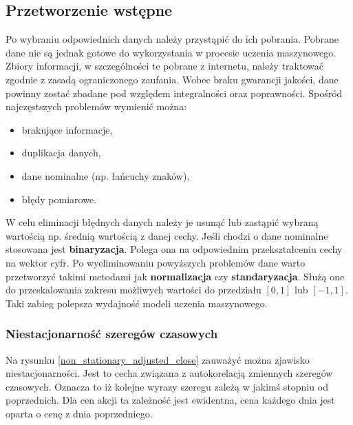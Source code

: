 \documentclass[a4paper, twoside, 11pt, openright]{article}
\begin{document}
\subsection{Przetworzenie wstępne}

Po wybraniu odpowiednich danych należy przystąpić do ich pobrania. Pobrane dane nie są jednak gotowe do wykorzystania w procesie uczenia maszynowego. Zbiory informacji, w szczególności te pobrane z internetu, należy traktować zgodnie z zasadą ograniczonego zaufania. Wobec braku gwarancji jakości, dane powinny zostać zbadane pod względem integralności oraz poprawności. Spośród najczęstszych problemów wymienić można: 
\begin{itemize}
    \item brakujące informacje,
    \item duplikacja danych,
    \item dane nominalne (np. łańcuchy znaków),
    \item błędy pomiarowe.
\end{itemize}
W celu eliminacji błędnych danych należy je usunąć lub zastąpić wybraną wartością np. średnią wartością z danej cechy. Jeśli chodzi o dane nominalne stosowana jest \textbf{binaryzacja}. Polega ona na odpowiednim przekształceniu cechy na wektor cyfr. Po wyeliminowaniu powyższych problemów dane warto przetworzyć takimi metodami jak \textbf{normalizacja} czy \textbf{standaryzacja}. Służą one do przeskalowania zakresu możliwych wartości do przedziału $[0,1]$ lub $[-1,1]$. Taki zabieg polepsza wydajność modeli uczenia maszynowego.

\bigskip

\subsubsection{Niestacjonarność szeregów czasowych}

Na rysunku \ref{non_stationary_adjusted_close} zauważyć można zjawisko niestacjonarności. Jest to cecha związana z autokorelacją zmiennych szeregów czasowych. Oznacza to iż kolejne wyrazy szeregu zależą w jakimś stopniu od poprzednich. Dla cen akcji ta zależność jest ewidentna, cena każdego dnia jest oparta o cenę z dnia poprzedniego. 
\end{document}
